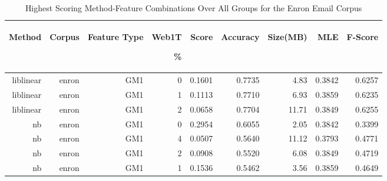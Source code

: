\begin{table}[htbp!]
	\begin{center}
		\begin{tabular}{ | r | r | r | r | r | r | r | r | r |}
			\hline
			\begin{sideways}Method\end{sideways} & \begin{sideways}Corpus\end{sideways} & \begin{sideways}Feature Type\end{sideways} & \begin{sideways}Web1T\end{sideways} \% & \begin{sideways}Score\end{sideways} & \begin{sideways}Accuracy\end{sideways} & \begin{sideways}Size(MB)\end{sideways} &\begin{sideways}MLE\end{sideways} & \begin{sideways}F-Score\end{sideways}\\ \hline

liblinear & enron & GM1 & 0 & 0.1601 & 0.7735 & 4.83 & 0.3842 & 0.6257\\ \hline 
liblinear & enron & GM1 & 1 & 0.1113 & 0.7710 & 6.93 & 0.3859 & 0.6235\\ \hline 
liblinear & enron & GM1 & 2 & 0.0658 & 0.7704 & 11.71 & 0.3849 & 0.6255\\ \hline 
nb & enron & GM1 & 0 & 0.2954 & 0.6055 & 2.05 & 0.3842 & 0.3399\\ \hline 
nb & enron & GM1 & 4 & 0.0507 & 0.5640 & 11.12 & 0.3793 & 0.4771\\ \hline 
nb & enron & GM1 & 2 & 0.0908 & 0.5520 & 6.08 & 0.3849 & 0.4719\\ \hline 
nb & enron & GM1 & 1 & 0.1536 & 0.5462 & 3.56 & 0.3859 & 0.4649\\ \hline 

\end{tabular}
		\caption{Highest Scoring Method-Feature Combinations Over All Groups for the Enron Email Corpus}
		\label{tab:top_enron_by_score_all_groups_under_16mb}
	\end{center}
\end{table}

